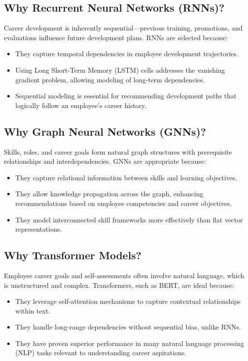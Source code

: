 \subsection{Why Recurrent Neural Networks (RNNs)?}
Career development is inherently sequential—previous training, promotions, and evaluations influence future development plans. RNNs are selected because:
\begin{itemize}
    \item They capture temporal dependencies in employee development trajectories.
    \item Using Long Short-Term Memory (LSTM) cells addresses the vanishing gradient problem, allowing modeling of long-term dependencies.
    \item Sequential modeling is essential for recommending development paths that logically follow an employee's career history.
\end{itemize}

\subsection{Why Graph Neural Networks (GNNs)?}
Skills, roles, and career goals form natural graph structures with prerequisite relationships and interdependencies. GNNs are appropriate because:
\begin{itemize}
    \item They capture relational information between skills and learning objectives.
    \item They allow knowledge propagation across the graph, enhancing recommendations based on employee competencies and career objectives.
    \item They model interconnected skill frameworks more effectively than flat vector representations.
\end{itemize}

\subsection{Why Transformer Models?}
Employee career goals and self-assessments often involve natural language, which is unstructured and complex. Transformers, such as BERT, are ideal because:
\begin{itemize}
    \item They leverage self-attention mechanisms to capture contextual relationships within text.
    \item They handle long-range dependencies without sequential bias, unlike RNNs.
    \item They have proven superior performance in many natural language processing (NLP) tasks relevant to understanding career aspirations.
\end{itemize}


